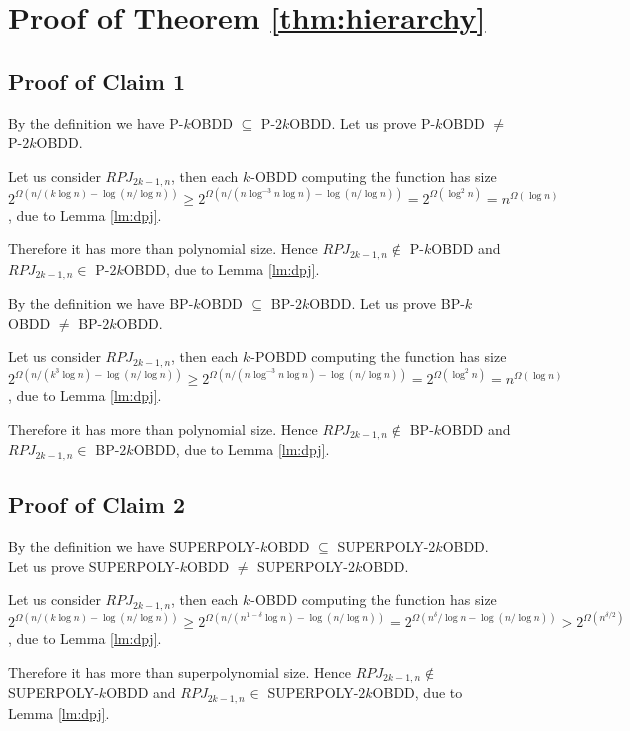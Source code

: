 \documentclass{llncs}
\begin{document}
\section{Proof of Theorem \ref{thm:hierarchy}}\label{apx:hierarchy}

\subsection{Proof of Claim 1}
By the definition we have P-$k$OBDD $\subseteq$ P-$2k$OBDD. Let us prove P-$k$OBDD $\neq$ P-$2k$OBDD.  

Let us consider $RPJ_{2k-1,n}$, then each $k$-OBDD computing the function has size  
$2^{\Omega(n/(k\log n)-\log (n/\log n))}\geq  
2^{\Omega(n/(n\log^{-3} n \log n)- \log (n/\log n))}=2^{\Omega(\log^2n)}
=n^{\Omega(\log n)}$, due to Lemma \ref{lm:dpj}.

 Therefore it has more than polynomial size. Hence $RPJ_{2k-1,n}\not\in$ P-$k$OBDD and $RPJ_{2k-1,n}\in$ P-$2k$OBDD, 
 due to Lemma \ref{lm:dpj}.
 
 By the definition we have BP-$k$OBDD $\subseteq$ BP-$2k$OBDD. Let us prove BP-$k$OBDD $\neq$ BP-$2k$OBDD.  

Let us consider $RPJ_{2k-1,n}$, then each $k$-POBDD computing the function has size  
$2^{\Omega( n/(k^3\log n)  - \log(n/\log n))}\geq  
2^{\Omega(n/(n\log^{-3} n \log n)- \log (n/\log n))}=2^{\Omega(\log^2n)}
=n^{\Omega(\log n)}$, due to Lemma \ref{lm:dpj}.

 Therefore it has more than polynomial size. Hence $RPJ_{2k-1,n}\not\in$ BP-$k$OBDD and $RPJ_{2k-1,n}\in$ BP-$2k$OBDD, 
 due to Lemma \ref{lm:dpj}.
 
 

\subsection{Proof of Claim 2}

By the definition we have SUPERPOLY-$k$OBDD $\subseteq$ SUPERPOLY-$2k$OBDD. Let us prove SUPERPOLY-$k$OBDD $\neq$ SUPERPOLY-$2k$OBDD.  

Let us consider $RPJ_{2k-1,n}$, then each $k$-OBDD computing the function has size  
$2^{\Omega(n/(k\log n)-\log (n/\log n))}\geq  
2^{\Omega(n/(n^{1-\delta} \log n) -\log (n/\log n))}=2^{\Omega(n^{\delta}/\log n -\log (n/\log n))}
>2^{\Omega(n^{\delta/2})}$, due to Lemma \ref{lm:dpj}.

 Therefore it has more than superpolynomial size. Hence $RPJ_{2k-1,n}\not\in$ SUPERPOLY-$k$OBDD and $RPJ_{2k-1,n}\in$ SUPERPOLY-$2k$OBDD, 
 due to Lemma \ref{lm:dpj}.
 
\end{document}
